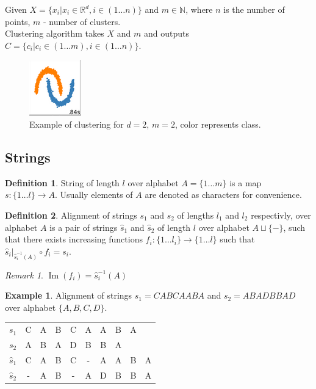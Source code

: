 \documentclass[a4paper, 12pt]{article}
\DeclareMathOperator{\Image}{Im}
\theoremstyle{definition}
\newtheorem{definition}{Definition}[section]
\theoremstyle{definition}
\newtheorem{example}{Example}[section]
\theoremstyle{remark}
\newtheorem*{remark}{Remark}
\begin{document}
Given $X = \{x_i | x_i \in \mathbb{R}^d, i \in \left( 1 \ldots n \right) \}$ and $m \in \mathbb{N}$,
where $n$ is the number of points, $m$ - number of clusters. \\
Clustering algorithm takes $X$ and $m$ and outputs $C = \{ c_i | c_i \in \left( 1 \ldots m \right), i \in \left( 1 \ldots n \right)\}$.

\begin{figure}[H]
    \includegraphics{example_clustering}
    \centering
    \caption{Example of clustering for $d=2$, $m=2$, color represents class.}
\end{figure}

\subsection{Strings}

\begin{definition}
    String of length $l$ over alphabet $A = \{ 1 \ldots m \}$ is a map $s: \{ 1 \ldots l\} \rightarrow A$.
    Usually elements of $A$ are denoted as characters for convenience.
\end{definition}

\begin{definition}
    Alignment of strings $s_1$ and $s_2$ of lengths $l_1$ and $l_2$ respectivly, 
    over alphabet $A$ is a pair of strings $\hat{s}_1$ and $\hat{s}_2$ 
    of length $l$ over alphabet $A \sqcup \{ - \}$, 
    such that there exists increasing functions $f_i: \{1 \ldots l_i \} \rightarrow \{ 1 \ldots l\}$ such that $\hat{s}_i|_{\hat{s}_i^{-1} (A)} \circ f_i = s_i$.
\end{definition}

\begin{remark}
    $\Image (f_i) = \hat{s}_i^{-1}(A)$
\end{remark}

\begin{example}
    Alignment of strings $s_1 = CABCAABA$ and $s_2 = ABADBBAD$ 
    over alphabet $\{ A, B, C, D\}$.

    \begin{center}
        \begin{tabular}{|| c | c c c c c c c c c ||}
         $s_1$ & C & A & B & C & A & A & B & A & \\ 
         $s_2$ & A & B & A & D & B & B & A &   & \\  
         $\hat{s}_1$ & C & A & B & C & - & A & A & B & A \\ 
         $\hat{s}_2$ & - & A & B & - & A & D & B & B & A   
        \end{tabular}
    \end{center}
\end{example}
\end{document}
